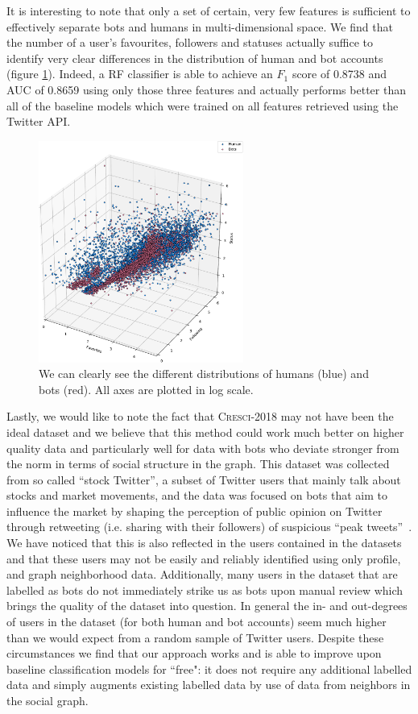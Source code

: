 It is interesting to note that only a set of certain, very few features is sufficient to effectively separate bots and humans in multi-dimensional space. We find that the number of a user's favourites, followers and statuses actually suffice to identify very clear differences in the distribution of human and bot accounts (figure \ref{fig:3dvis}). Indeed, a RF classifier is able to achieve an $F_1$ score of 0.8738 and AUC of 0.8659 using only those three features and actually performs better than all of the baseline models which were trained on all features retrieved using the Twitter API.

\begin{figure}
    \centering
    \includegraphics[width=0.6\textwidth]{paper/FIG/3dvis_base-crop.pdf}
    \caption{We can clearly see the different distributions of humans (blue) and bots (red). All axes are plotted in log scale.}
    \label{fig:3dvis}
\end{figure}

Lastly, we would like to note the fact that \textsc{Cresci-2018} may not have been the ideal dataset and we believe that this method could work much better on higher quality data and particularly well for data with bots who deviate stronger from the norm in terms of social structure in the graph. This dataset was collected from so called ``stock Twitter'', a subset of Twitter users that mainly talk about stocks and market movements, and the data was focused on bots that aim to influence the market by shaping the perception of public opinion on Twitter through retweeting (i.e. sharing with their followers) of suspicious ``peak tweets''~\cite{cresci2018fake}. We have noticed that this is also reflected in the users contained in the datasets and that these users may not be easily and reliably identified using only profile, and graph neighborhood data. Additionally, many users in the dataset that are labelled as bots do not immediately strike us as bots upon manual review which brings the quality of the dataset into question. In general the in- and out-degrees of users in the dataset (for both human and bot accounts) seem much higher than we would expect from a random sample of Twitter users. Despite these circumstances we find that our approach works and is able to improve upon baseline classification models for ``free": it does not require any additional labelled data and simply augments existing labelled data by use of data from neighbors in the social graph. 